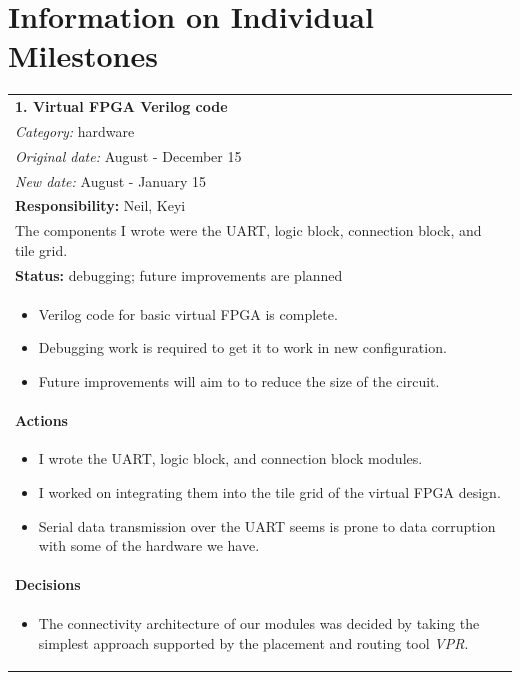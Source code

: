 \documentclass[12pt,letterpaper]{article}
\begin{document}
\section{Information on Individual Milestones}

\begin{tabular}{|p{6.4in}|}
\hline
\textbf{1. Virtual FPGA Verilog code} \\
\emph{Category:} hardware \\
\emph{Original date:} August - December 15 \\
\emph{New date:} August - January 15 \\
\hline
\textbf{Responsibility:} Neil, Keyi \\
The components I wrote were the UART, logic block, connection block, and tile grid. \\
\hline
\textbf{Status:} debugging; future improvements are planned \\
\vspace{-1em}
\begin{itemize}
\item Verilog code for basic virtual FPGA is complete.
\item Debugging work is required to get it to work in new configuration.
\item Future improvements will aim to to reduce the size of the circuit.
\end{itemize} 
\vspace{-1em} \\
\hline
\textbf{Actions} \\
\vspace{-1em}
\begin{itemize}
\item I wrote the UART, logic block, and connection block modules.
\item I worked on integrating them into the tile grid of the virtual FPGA design.
\item Serial data transmission over the UART seems is prone to data corruption with some of the hardware we have.
\end{itemize} 
\vspace{-1em} \\
\hline
\textbf{Decisions} \\
\vspace{-1em}
\begin{itemize}
\item The connectivity architecture of our modules was decided by taking the simplest approach supported by the placement and routing tool \emph{VPR}.

\end{itemize}
\end{tabular}
\end{document}
